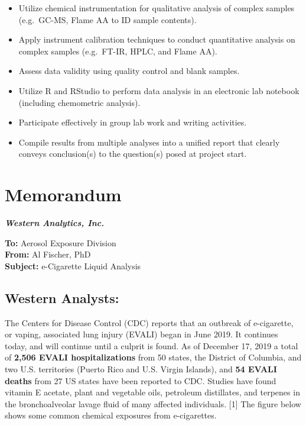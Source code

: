 \documentclass[]{tufte-book}
\providecommand{\tightlist}{%
  \setlength{\itemsep}{0pt}\setlength{\parskip}{0pt}}
\begin{document}
\begin{itemize}
\tightlist
\item
  Utilize chemical instrumentation for qualitative analysis of complex samples (e.g.~GC-MS, Flame AA to ID sample contents).\\
\item
  Apply instrument calibration techniques to conduct quantitative analysis on complex samples (e.g.~FT-IR, HPLC, and Flame AA).\\
\item
  Assess data validity using quality control and blank samples.\\
\item
  Utilize R and RStudio to perform data analysis in an electronic lab notebook (including chemometric analysis).\\
\item
  Participate effectively in group lab work and writing activities.\\
\item
  Compile results from multiple analyses into a unified report that clearly conveys conclusion(s) to the question(s) posed at project start.
\end{itemize}

\newpage

\hypertarget{memorandum}{%
\section*{Memorandum}\label{memorandum}}

\noindent
\textbf{\emph{Western Analytics, Inc.}}

\noindent  
\textbf{To:} Aerosol Exposure Division\\
\noindent  
\textbf{From:} Al Fischer, PhD\\
\noindent  
\textbf{Subject:} e-Cigarette Liquid Analysis

\hypertarget{western-analysts}{%
\subsection*{Western Analysts:}\label{western-analysts}}

The Centers for Disease Control (CDC) reports that an outbreak of e-cigarette, or vaping, associated lung injury (EVALI) began in June 2019. It continues today, and will continue until a culprit is found. As of December 17, 2019 a total of \textbf{2,506 EVALI hospitalizations} from 50 states, the District of Columbia, and two U.S. territories (Puerto Rico and U.S. Virgin Islands), and \textbf{54 EVALI deaths} from 27 US states have been reported to CDC. Studies have found vitamin E acetate, plant and vegetable oils, petroleum distillates, and terpenes in the bronchoalveolar lavage fluid of many affected individuals. {[}1{]} The figure below shows some common chemical exposures from e-cigarettes.
\end{document}
